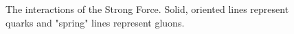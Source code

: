 \begin{figure}
  \centering
  \begin{minipage}[c]{0.3\textwidth}    
   \centering
   
  \end{minipage}
  \begin{minipage}[c]{0.3\textwidth}
    \centering
    
  \end{minipage}
  \begin{minipage}[c]{0.3\textwidth}
    \centering 
    
    \end{minipage}
    \caption{The interactions of the Strong Force. Solid, oriented lines represent quarks and "spring" lines represent gluons.}
    \label{fig:strong_interactions}
\end{figure}



